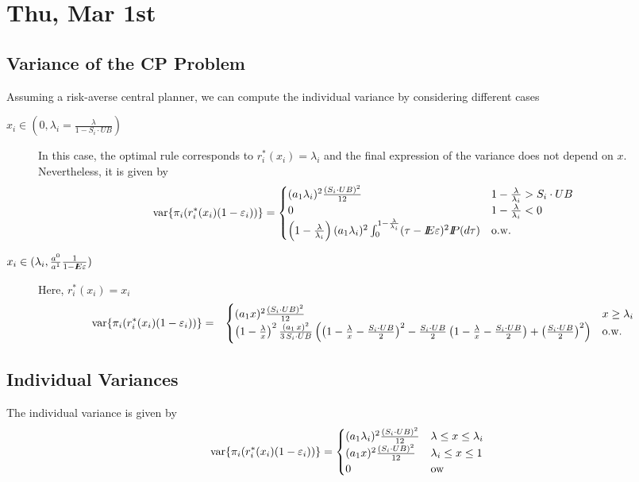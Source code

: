 \section{Thu, Mar 1st}
\subsection{Variance of the CP Problem}
Assuming a risk-averse central planner, we can compute the individual variance by
considering different cases
\begin{description}
\item[$x_i\in(0,\lambda_i=\frac{\lambda}{1-S_i\cdot UB})$]
In this case, the optimal rule corresponds to $r_i^*(x_i)=\lambda_i$ and the final expression of the variance does not depend on $x$. Nevertheless, it is given by
\[{\mathop{\rm var}\nolimits}\{\pi_i(r^*_i(x_i)(1-\varepsilon_i))\}=\displaystyle\begin{cases}
(a_1\lambda_i)^2\frac{(S_i\cdot UB)^2}{12}&1-\frac{\lambda}{\lambda_i}>S_i\cdot UB\\
0&1-\frac{\lambda}{\lambda_i}<0\\
\left(1-\frac{\lambda}{\lambda_i}\right)(a_1\lambda_i)^2\int_0^{1-\frac{\lambda}{\lambda_i}}(\tau-{I\kern-.35em E}\varepsilon)^2{I\kern-.35em P}(d\tau)&{\rm o.w.}
\end{cases}\]

\item[$x_i\in(\lambda_i,\frac{a^0}{a^1}\frac{1}{1-{I\kern-.35em E}\varepsilon})$] Here, $r_i^*(x_i)=x_i$
\begin{eqnarray*}
{\mathop{\rm var}\nolimits}\{\pi_i(r^*_i(x_i)(1-\varepsilon_i))\}&=&\begin{cases}
(a_1 x)^2\frac{(S_i\cdot UB)^2}{12}&x\geq \lambda_i\\
\left(1-\frac{\lambda}{x}\right)^2\frac{(a_1\,x)^2}{3\,S_i\cdot UB}\left(\left(1-\frac{\lambda}{x}-\frac{S_i\cdot UB}{2}\right)^2-\frac{S_i\cdot UB}{2}\left(1-\frac{\lambda}{x}-\frac{S_i\cdot UB}{2}\right)+\left(\frac{S_i\cdot UB}{2}\right)^2\right)&{\rm o.w.}
\end{cases}
\end{eqnarray*}
\end{description}

\subsection{Individual Variances}
The individual variance is given by
\begin{equation}\label{indvar}
{\mathop{\rm var}\nolimits}\{\pi_i(r^*_i(x_i)(1-\varepsilon_i))\}=\begin{cases}
(a_1\lambda_i)^2\frac{(S_i\cdot UB)^2}{12}&\lambda\leq x\leq \lambda_i\\
(a_1 x)^2\frac{(S_i\cdot UB)^2}{12}&\lambda_i\leq x\leq 1\\
0& {\rm ow}
\end{cases}
\end{equation}

